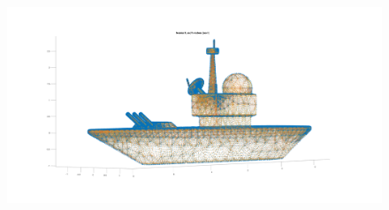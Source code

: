 \documentclass[11pt, oneside]{article}   	%
\begin{document}
\begin{figure}[H]
\begin{center}
\includegraphics[width=6in]{war_ship_5.pdf}
\end{center}
\caption{}
\label{war_ship_5}
\end{figure}





  
\end{document}
